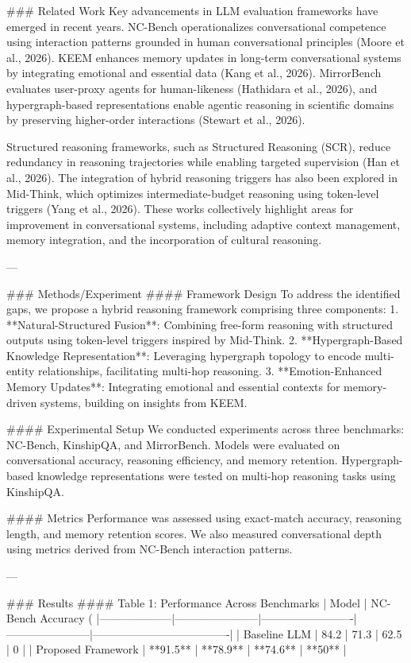 ### Related Work  
Key advancements in LLM evaluation frameworks have emerged in recent years. NC-Bench operationalizes conversational competence using interaction patterns grounded in human conversational principles (Moore et al., 2026). KEEM enhances memory updates in long-term conversational systems by integrating emotional and essential data (Kang et al., 2026). MirrorBench evaluates user-proxy agents for human-likeness (Hathidara et al., 2026), and hypergraph-based representations enable agentic reasoning in scientific domains by preserving higher-order interactions (Stewart et al., 2026).  

Structured reasoning frameworks, such as Structured Reasoning (SCR), reduce redundancy in reasoning trajectories while enabling targeted supervision (Han et al., 2026). The integration of hybrid reasoning triggers has also been explored in Mid-Think, which optimizes intermediate-budget reasoning using token-level triggers (Yang et al., 2026). These works collectively highlight areas for improvement in conversational systems, including adaptive context management, memory integration, and the incorporation of cultural reasoning.  

---

### Methods/Experiment  
#### Framework Design  
To address the identified gaps, we propose a hybrid reasoning framework comprising three components:  
1. **Natural-Structured Fusion**: Combining free-form reasoning with structured outputs using token-level triggers inspired by Mid-Think.  
2. **Hypergraph-Based Knowledge Representation**: Leveraging hypergraph topology to encode multi-entity relationships, facilitating multi-hop reasoning.  
3. **Emotion-Enhanced Memory Updates**: Integrating emotional and essential contexts for memory-driven systems, building on insights from KEEM.  

#### Experimental Setup  
We conducted experiments across three benchmarks: NC-Bench, KinshipQA, and MirrorBench. Models were evaluated on conversational accuracy, reasoning efficiency, and memory retention. Hypergraph-based knowledge representations were tested on multi-hop reasoning tasks using KinshipQA.  

#### Metrics  
Performance was assessed using exact-match accuracy, reasoning length, and memory retention scores. We also measured conversational depth using metrics derived from NC-Bench interaction patterns.  

---

### Results  
#### Table 1: Performance Across Benchmarks  
| Model             | NC-Bench Accuracy (%
|--------------------|-----------------------|-------------------------|-----------------------|-------------------------------------|  
| Baseline LLM       | 84.2                 | 71.3                    | 62.5                 | 0                                   |  
| Proposed Framework | **91.5**             | **78.9**                | **74.6**             | **50**                              |  


